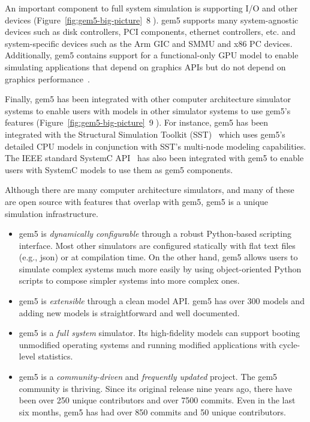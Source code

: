An important component to full system simulation is supporting I/O and other devices (Figure~\ref{fig:gem5-big-picture}~\textcircled{8}).
gem5 supports many system-agnostic devices such as disk controllers, PCI components, ethernet controllers, etc. and system-specific devices such as the Arm GIC and SMMU and x86 PC devices.
Additionally, gem5 contains support for a functional-only GPU model to enable simulating applications that depend on graphics APIs but do not depend on graphics performance~\cite{nomali}.

Finally, gem5 has been integrated with other computer architecture simulator systems to enable users with models in other simulator systems to use gem5's features (Figure~\ref{fig:gem5-big-picture}~\textcircled{9}).
For instance, gem5 has been integrated with the Structural Simulation Toolkit (SST)~\cite{sst-gem5} which uses gem5's detailed CPU models in conjunction with SST's multi-node modeling capabilities.
The IEEE standard SystemC API~\cite{menard2017-system-systemc} has also been integrated with gem5 to enable users with SystemC models to use them as gem5 components.

Although there are many computer architecture simulators, and many of these are open source with features that overlap with gem5, gem5 is a unique simulation infrastructure.
\begin{itemize}
    \item gem5 is \emph{dynamically configurable} through a robust Python-based scripting interface. Most other simulators are configured statically with flat text files (e.g., json) or at compilation time. On the other hand, gem5 allows users to simulate complex systems much more easily by using object-oriented Python scripts to compose simpler systems into more complex ones.
    \item gem5 is \emph{extensible} through a clean model API. gem5 has over 300 models and adding new models is straightforward and well documented.
    \item gem5 is a \emph{full system} simulator. Its high-fidelity models can support booting unmodified operating systems and running modified applications with cycle-level statistics.
    \item gem5 is a \emph{community-driven} and \emph{frequently updated} project. The gem5 community is thriving. Since its original release nine years ago, there have been over 250 unique contributors and over 7500 commits. Even in the last six months, gem5 has had over 850 commits and 50 unique contributors.
\end{itemize}

